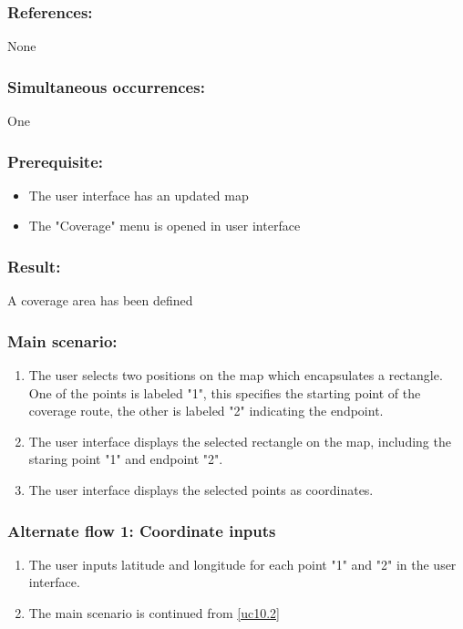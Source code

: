 \subsubsection*{References:}
None

\subsubsection*{Simultaneous occurrences:}
One

\subsubsection*{Prerequisite:}
\begin{itemize}
	\item The user interface has an updated map
	\item The "Coverage" menu is opened in user interface
\end{itemize}

\subsubsection*{Result:}
A coverage area has been defined

\subsubsection*{Main scenario:}
\begin{enumerate}
	\item The user selects two positions on the map which encapsulates a rectangle. One of the points is labeled "1", this specifies the starting point of the coverage route, the other is labeled "2" indicating the endpoint.
	\item \label{uc10.2} The user interface displays the selected rectangle on the map, including the staring point "1" and endpoint "2".
	\item The user interface displays the selected points as coordinates.
\end{enumerate}	

\subsubsection*{Alternate flow 1: Coordinate inputs}
\begin{enumerate}
	\item The user inputs latitude and longitude for each point "1" and "2" in the user interface.
	\item The main scenario is continued from \ref{uc10.2}
\end{enumerate}


